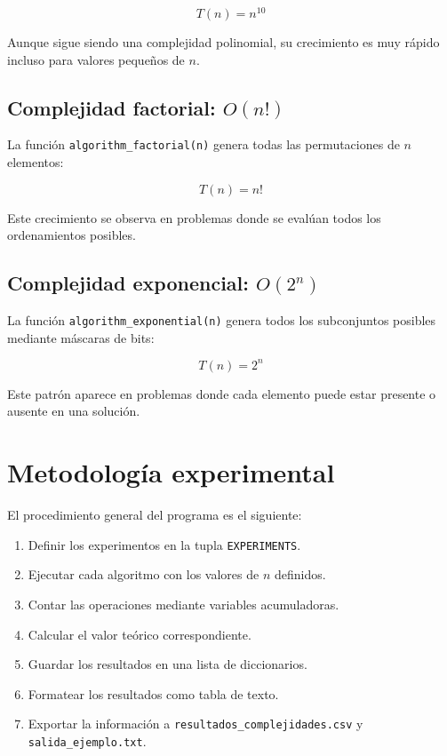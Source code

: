 \documentclass[12pt,letterpaper]{article}
\begin{document}
\[
T(n) = n^{10}
\]

Aunque sigue siendo una complejidad polinomial, su crecimiento es muy rápido incluso para valores pequeños de $n$.

\subsection{Complejidad factorial: \texorpdfstring{$O(n!)$}{O(n!)}}

La función \texttt{algorithm\_factorial(n)} genera todas las permutaciones de $n$ elementos:

\[
T(n) = n!
\]

Este crecimiento se observa en problemas donde se evalúan todos los ordenamientos posibles.

\subsection{Complejidad exponencial: \texorpdfstring{$O(2^n)$}{O(2n)}}

La función \texttt{algorithm\_exponential(n)} genera todos los subconjuntos posibles mediante máscaras de bits:

\[
T(n) = 2^n
\]

Este patrón aparece en problemas donde cada elemento puede estar presente o ausente en una solución.

\section{Metodología experimental}

El procedimiento general del programa es el siguiente:

\begin{enumerate}
    \item Definir los experimentos en la tupla \texttt{EXPERIMENTS}.
    \item Ejecutar cada algoritmo con los valores de $n$ definidos.
    \item Contar las operaciones mediante variables acumuladoras.
    \item Calcular el valor teórico correspondiente.
    \item Guardar los resultados en una lista de diccionarios.
    \item Formatear los resultados como tabla de texto.
    \item Exportar la información a \texttt{resultados\_complejidades.csv} y \texttt{salida\_ejemplo.txt}.
\end{enumerate}
\end{document}
